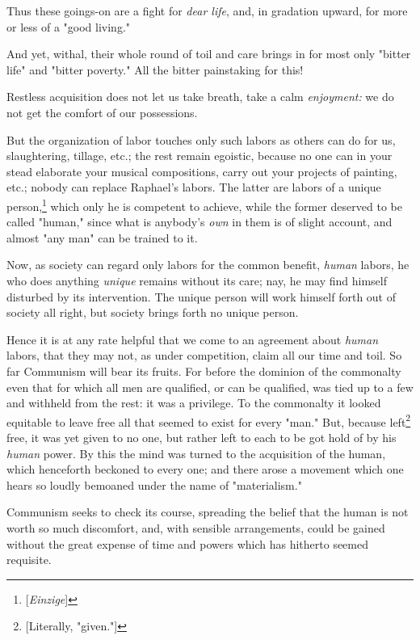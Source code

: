 \documentclass[a4paper]{book}
\begin{document}
Thus these goings-on are a fight for \textit{dear life}, and, in gradation 
upward, for more or less of a "{}good living."{}

And yet, withal, their whole round of toil and care brings in for most only 
"{}bitter life"{} and "{}bitter poverty."{} All the bitter painstaking for 
this!

Restless acquisition does not let us take breath, take a calm 
\textit{enjoyment:} we do not get the comfort of our possessions.

But the organization of labor touches only such labors as others can do for 
us, slaughtering, tillage, etc.; the rest remain egoistic, because no one can 
in your stead elaborate your musical compositions, carry out your projects of 
painting, etc.; nobody can replace Raphael's labors. The latter are labors of 
a unique person,\footnote{[\textit{Einzige}]} which only he is competent to 
achieve, while the former deserved to be called "{}human,"{} since what is 
anybody's \textit{own} in them is of slight account, and almost "{}any man"{} 
can be trained to it.

Now, as society can regard only labors for the common benefit, \textit{human} 
labors, he who does anything \textit{unique} remains without its care; nay, he 
may find himself disturbed by its intervention. The unique person will work 
himself forth out of society all right, but society brings forth no unique 
person.

Hence it is at any rate helpful that we come to an agreement about 
\textit{human} labors, that they may not, as under competition, claim all our 
time and toil. So far Communism will bear its fruits. For before the dominion 
of the commonalty even that for which all men are qualified, or can be 
qualified, was tied up to a few and withheld from the rest: it was a 
privilege. To the commonalty it looked equitable to leave free all that seemed 
to exist for every "{}man."{} But, because left\footnote{[Literally, 
"{}given."{}]} free, it was yet given to no one, but rather left to each to be 
got hold of by his \textit{human} power. By this the mind was turned to the 
acquisition of the human, which henceforth beckoned to every one; and there 
arose a movement which one hears so loudly bemoaned under the name of 
"{}materialism."{}

Communism seeks to check its course, spreading the belief that the human is 
not worth so much discomfort, and, with sensible arrangements, could be gained 
without the great expense of time and powers which has hitherto seemed 
requisite.
\end{document}
